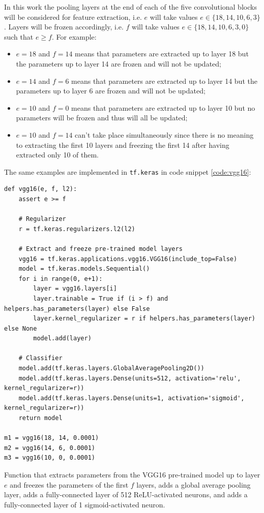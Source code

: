 In this work the pooling layers at the end of each of the five convolutional blocks will be considered for feature extraction, i.e. $e$ will take values $e \in \{18, 14, 10, 6, 3\}$. Layers will be frozen accordingly, i.e. $f$ will take values $e \in \{18, 14, 10, 6, 3, 0\}$ such that $e \geq f$. For example:

\begin{itemize}
    \item $e = 18$ and $f = 14$ means that parameters are extracted up to layer 18 but the parameters up to layer 14 are frozen and will not be updated;
    \item $e = 14$ and $f = 6$ means that parameters are extracted up to layer 14 but the parameters up to layer 6 are frozen and will not be updated;
    \item $e = 10$ and $f = 0$ means that parameters are extracted up to layer 10 but no parameters will be frozen and thus will all be updated;
    \item $e = 10$ and $f = 14$ can't take place simultaneously since there is no meaning to extracting the first 10 layers and freezing the first 14 after having extracted only 10 of them.
\end{itemize}

The same examples are implemented in \verb|tf.keras| in code snippet \ref{code:vgg16}:

\begin{listing}[ht]
\begin{verbatim}
def vgg16(e, f, l2):
    assert e >= f

    # Regularizer
    r = tf.keras.regularizers.l2(l2)

    # Extract and freeze pre-trained model layers
    vgg16 = tf.keras.applications.vgg16.VGG16(include_top=False)
    model = tf.keras.models.Sequential()
    for i in range(0, e+1):
        layer = vgg16.layers[i]
        layer.trainable = True if (i > f) and helpers.has_parameters(layer) else False
        layer.kernel_regularizer = r if helpers.has_parameters(layer) else None
        model.add(layer)

    # Classifier
    model.add(tf.keras.layers.GlobalAveragePooling2D())
    model.add(tf.keras.layers.Dense(units=512, activation='relu', kernel_regularizer=r))
    model.add(tf.keras.layers.Dense(units=1, activation='sigmoid', kernel_regularizer=r))
    return model

m1 = vgg16(18, 14, 0.0001)
m2 = vgg16(14, 6, 0.0001)
m3 = vgg16(10, 0, 0.0001)
\end{verbatim}
\caption{Function that extracts parameters from the VGG16 pre-trained model up to layer $e$ and freezes the parameters of the first $f$ layers, adds a global average pooling layer, adds a fully-connected layer of 512 ReLU-activated neurons, and adds a fully-connected layer of 1 sigmoid-activated neuron.}
\label{code:vgg16}
\end{listing}


